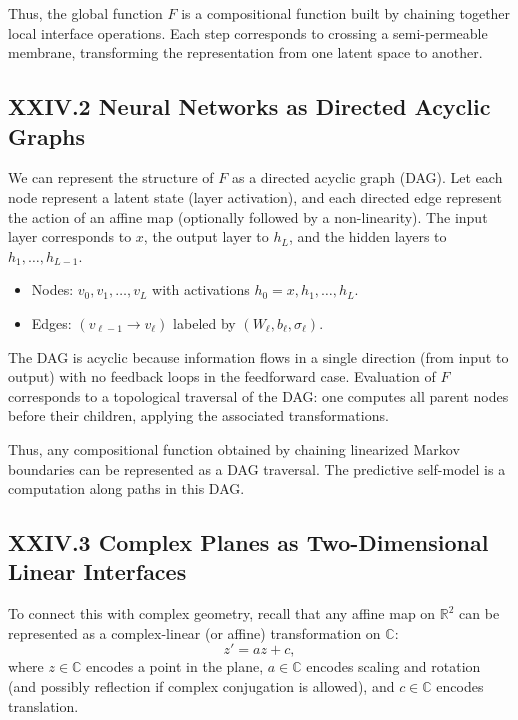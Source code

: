 \documentclass[11pt,letterpaper]{article}
\begin{document}
Thus, the global function $F$ is a compositional function built by chaining together local interface operations. Each step corresponds to crossing a semi-permeable membrane, transforming the representation from one latent space to another.

\subsection{XXIV.2 Neural Networks as Directed Acyclic Graphs}

We can represent the structure of $F$ as a directed acyclic graph (DAG). Let each node represent a latent state (layer activation), and each directed edge represent the action of an affine map (optionally followed by a non-linearity). The input layer corresponds to $x$, the output layer to $h_L$, and the hidden layers to $h_1, \dots, h_{L-1}$.

\begin{itemize}
    \item Nodes: $v_0, v_1, \dots, v_L$ with activations $h_0 = x, h_1, \dots, h_L$.
    \item Edges: $(v_{\ell-1} \to v_\ell)$ labeled by $(W_\ell, b_\ell, \sigma_\ell)$.
\end{itemize}

The DAG is acyclic because information flows in a single direction (from input to output) with no feedback loops in the feedforward case. Evaluation of $F$ corresponds to a topological traversal of the DAG: one computes all parent nodes before their children, applying the associated transformations.

Thus, any compositional function obtained by chaining linearized Markov boundaries can be represented as a DAG traversal. The predictive self-model is a computation along paths in this DAG.

\subsection{XXIV.3 Complex Planes as Two-Dimensional Linear Interfaces}

To connect this with complex geometry, recall that any affine map on $\mathbb{R}^2$ can be represented as a complex-linear (or affine) transformation on $\mathbb{C}$:
\[
z' = a z + c,
\]
where $z \in \mathbb{C}$ encodes a point in the plane, $a \in \mathbb{C}$ encodes scaling and rotation (and possibly reflection if complex conjugation is allowed), and $c \in \mathbb{C}$ encodes translation.
\end{document}
